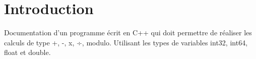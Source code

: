 \hypertarget{index_intro_sec}{}\section{Introduction}\label{index_intro_sec}
Documentation d'un programme écrit en C++ qui doit permettre de réaliser les calculs de type +, -\/, x, ÷, modulo. Utilisant les types de variables int32, int64, float et double. 